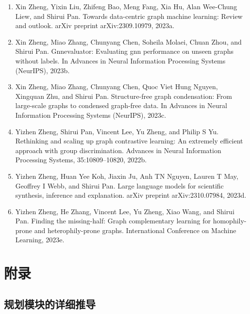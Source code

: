 \documentclass[11pt,UTF8,fontset=fandol]{ctexart}
\begin{document}
\begin{enumerate}[leftmargin=2em]
\item Xin Zheng, Yixin Liu, Zhifeng Bao, Meng Fang, Xia Hu, Alan Wee-Chung Liew, and Shirui Pan. Towards data-centric graph machine learning: Review and outlook. arXiv preprint arXiv:2309.10979, 2023a.
\item Xin Zheng, Miao Zhang, Chunyang Chen, Soheila Molaei, Chuan Zhou, and Shirui Pan. Gnnevaluator: Evaluating gnn performance on unseen graphs without labels. In Advances in Neural Information Processing Systems (NeurIPS), 2023b.
\item Xin Zheng, Miao Zhang, Chunyang Chen, Quoc Viet Hung Nguyen, Xingquan Zhu, and Shirui Pan. Structure-free graph condensation: From large-scale graphs to condensed graph-free data. In Advances in Neural Information Processing Systems (NeurIPS), 2023c.
\item Yizhen Zheng, Shirui Pan, Vincent Lee, Yu Zheng, and Philip S Yu. Rethinking and scaling up graph contrastive learning: An extremely efficient approach with group discrimination. Advances in Neural Information Processing Systems, 35:10809--10820, 2022b.
\item Yizhen Zheng, Huan Yee Koh, Jiaxin Ju, Anh TN Nguyen, Lauren T May, Geoffrey I Webb, and Shirui Pan. Large language models for scientific synthesis, inference and explanation. arXiv preprint arXiv:2310.07984, 2023d.
\item Yizhen Zheng, He Zhang, Vincent Lee, Yu Zheng, Xiao Wang, and Shirui Pan. Finding the missing-half: Graph complementary learning for homophily-prone and heterophily-prone graphs. International Conference on Machine Learning, 2023e.
\end{enumerate}

\appendix
\section{附录}

\subsection{规划模块的详细推导}
\label{app:a1}
\end{document}
